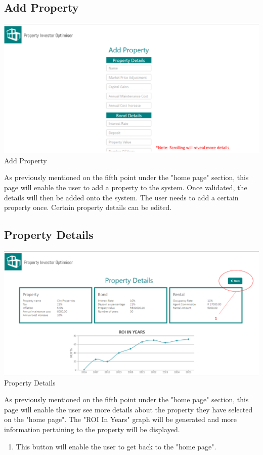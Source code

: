 \documentclass[a4paper,12pt]{article}
\begin{document}
\subsection{Add Property}
		\includegraphics[width=0.9\linewidth, center]{./System/AddProperty.PNG}\\[0.4cm]  
		\caption{Add Property}
As previously mentioned on the fifth point under the "home page" section, this page will enable the user to add a property to the system. Once validated, the details will then be added onto the system. The user needs to add a certain property once. Certain property details can be edited.  

\subsection{Property Details}
		\includegraphics[width=0.9\linewidth, center]{./System/PropertyDetails.PNG}\\[0.4cm]  
		\caption{Property Details}
	As previously mentioned on the fifth point under the "home page" section, this page will enable the user see more details 			about the property they have selected on the "home page". The "ROI In Years" graph will be generated and more information 			pertaining to the property will be displayed.  
	\begin{enumerate}
		\item This button will enable the user to get back to the "home page".
	\end{enumerate}
	
\end{document}
